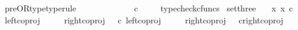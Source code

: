 \begin{isabellebody}
\isanewline
{}\isamarkupfalse%
\ pre{\isacharunderscore}{\kern0pt}OR{\isacharunderscore}{\kern0pt}type{\isacharbrackleft}{\kern0pt}type{\isacharunderscore}{\kern0pt}rule{\isacharbrackright}{\kern0pt}{\isacharcolon}{\kern0pt}\ \isanewline
\ \ {\isachardoublequoteopen}{\isasymlangle}{\isasymt}{\isacharcomma}{\kern0pt}\ {\isasymt}{\isasymrangle}{\isasymamalg}\ {\isacharparenleft}{\kern0pt}{\isasymlangle}{\isasymt}{\isacharcomma}{\kern0pt}\ {\isasymf}{\isasymrangle}\ {\isasymamalg}{\isasymlangle}{\isasymf}{\isacharcomma}{\kern0pt}\ {\isasymt}{\isasymrangle}{\isacharparenright}{\kern0pt}\ {\isacharcolon}{\kern0pt}\ {\isasymone}{\isasymCoprod}{\isacharparenleft}{\kern0pt}{\isasymone}{\isasymCoprod}{\isasymone}{\isacharparenright}{\kern0pt}\ {\isasymrightarrow}\ {\isasymOmega}\ {\isasymtimes}\isactrlsub c\ {\isasymOmega}{\isachardoublequoteclose}\isanewline
%
\isadelimproof
\ \ %
\endisadelimproof
%
\isatagproof
{}\isamarkupfalse%
\ typecheck{\isacharunderscore}{\kern0pt}cfuncs%
\endisatagproof
{\isafoldproof}%
%
\isadelimproof
\isanewline
%
\endisadelimproof
\isanewline
{}\isamarkupfalse%
\ set{\isacharunderscore}{\kern0pt}three{\isacharcolon}{\kern0pt}\ \isanewline
\ \ {\isachardoublequoteopen}{\isacharbraceleft}{\kern0pt}x{\isachardot}{\kern0pt}\ x\ {\isasymin}\isactrlsub c\ {\isacharparenleft}{\kern0pt}{\isasymone}{\isasymCoprod}{\isacharparenleft}{\kern0pt}{\isasymone}{\isasymCoprod}{\isasymone}{\isacharparenright}{\kern0pt}{\isacharparenright}{\kern0pt}{\isacharbraceright}{\kern0pt}\ {\isacharequal}{\kern0pt}\ {\isacharbraceleft}{\kern0pt}\isanewline
\ {\isacharparenleft}{\kern0pt}left{\isacharunderscore}{\kern0pt}coproj\ {\isasymone}\ {\isacharparenleft}{\kern0pt}{\isasymone}{\isasymCoprod}{\isasymone}{\isacharparenright}{\kern0pt}{\isacharparenright}{\kern0pt}\ {\isacharcomma}{\kern0pt}\ \isanewline
\ {\isacharparenleft}{\kern0pt}right{\isacharunderscore}{\kern0pt}coproj\ {\isasymone}\ {\isacharparenleft}{\kern0pt}{\isasymone}{\isasymCoprod}{\isasymone}{\isacharparenright}{\kern0pt}\ {\isasymcirc}\isactrlsub c\ left{\isacharunderscore}{\kern0pt}coproj\ {\isasymone}\ {\isasymone}{\isacharparenright}{\kern0pt}{\isacharcomma}{\kern0pt}\ \isanewline
\ \ right{\isacharunderscore}{\kern0pt}coproj\ {\isasymone}\ {\isacharparenleft}{\kern0pt}{\isasymone}{\isasymCoprod}{\isasymone}{\isacharparenright}{\kern0pt}\ {\isasymcirc}\isactrlsub c{\isacharparenleft}{\kern0pt}right{\isacharunderscore}{\kern0pt}coproj\ {\isasymone}\ {\isasymone}{\isacharparenright}{\kern0pt}{\isacharbraceright}{\kern0pt}{\isachardoublequoteclose}\isanewline

\end{isabellebody}
